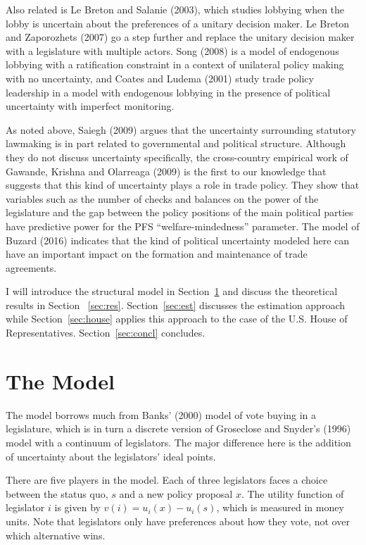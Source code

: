 \documentclass[12pt]{article}
\begin{document}
Also related is Le Breton and Salanie (2003), which studies lobbying when the lobby is uncertain about the preferences of a unitary decision maker. Le Breton and Zaporozhets (2007) go a step further and replace the unitary decision maker with a legislature with multiple actors. Song (2008) is a model of endogenous lobbying with a ratification constraint in a context of unilateral policy making with no uncertainty, and Coates and Ludema (2001) study trade policy leadership in a model with endogenous lobbying in the presence of political uncertainty with imperfect monitoring.

As noted above, Saiegh (2009) argues that the uncertainty surrounding statutory lawmaking is in part related to governmental and political structure. Although they do not discuss uncertainty specifically, the cross-country empirical work of Gawande, Krishna and Olarreaga (2009) is the first to our knowledge that suggests that this kind of uncertainty plays a role in trade policy. They show that variables such as the number of checks and balances on the power of the legislature and the gap between the policy positions of the main political parties have predictive power for the PFS ``welfare-mindedness'' parameter. The model of Buzard (2016) indicates that the kind of political uncertainty modeled here can have an important impact on the formation and maintenance of trade agreements.

I will introduce the structural model in Section~\ref{sec:model} and discuss the theoretical results in Section~ \ref{sec:res}. Section~\ref{sec:est} discusses the estimation approach while Section~\ref{sec:house} applies this approach to the case of the U.S. House of Representatives. Section~\ref{sec:concl} concludes.


\section{The Model}
\label{sec:model}

The model borrows much from Banks' (2000) model of vote buying in a legislature, which is in turn a discrete version of Groseclose and Snyder's (1996) model with a continuum of legislators. The major difference here is the addition of uncertainty about the legislators' ideal points.

There are five players in the model. Each of three legislators faces a choice between the status quo, $s$ and a new policy proposal $x$. The utility function of legislator $i$ is given by $v(i) = u_i(x) - u_i(s)$, which is measured in money units. Note that legislators only have preferences about how they vote, not over which alternative wins.
\end{document}
